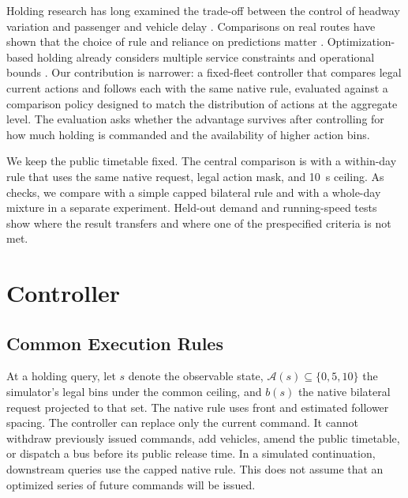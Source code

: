 \documentclass[journal]{IEEEtran}
\begin{document}
Holding research has long examined the trade-off between the control of headway variation and passenger and vehicle delay \cite{daganzo2009headway}. Comparisons on real routes have shown that the choice of rule and reliance on predictions matter \cite{berrebi2018comparing}. Optimization-based holding already considers multiple service constraints and operational bounds \cite{gkiotsalitis2019multiconstrained}. Our contribution is narrower: a fixed-fleet controller that compares legal current actions and follows each with the same native rule, evaluated against a comparison policy designed to match the distribution of actions at the aggregate level. The evaluation asks whether the advantage survives after controlling for how much holding is commanded and the availability of higher action bins.

We keep the public timetable fixed. The central comparison is with a within-day rule that uses the same native request, legal action mask, and 10~s ceiling. As checks, we compare with a simple capped bilateral rule and with a whole-day mixture in a separate experiment. Held-out demand and running-speed tests show where the result transfers and where one of the prespecified criteria is not met.

\section{Controller}
\subsection{Common Execution Rules}
At a holding query, let $s$ denote the observable state, $\mathcal A(s)\subseteq\{0,5,10\}$ the simulator's legal bins under the common ceiling, and $b(s)$ the native bilateral request projected to that set. The native rule uses front and estimated follower spacing. The controller can replace only the current command. It cannot withdraw previously issued commands, add vehicles, amend the public timetable, or dispatch a bus before its public release time. In a simulated continuation, downstream queries use the capped native rule. This does not assume that an optimized series of future commands will be issued.
\end{document}
